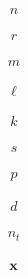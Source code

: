 \documentclass[12 pt]{article}
\begin{document}

\begin{align*}
    n
\end{align*}

\begin{align*}
    r
\end{align*}

\begin{align*}
    m
\end{align*}

\begin{align*}
    \ell
\end{align*}

\begin{align*}
    k
\end{align*}

\begin{align*}
    s
\end{align*}

\begin{align*}
    p
\end{align*}

\begin{align*}
    d
\end{align*}

\begin{align*}
    n_t
\end{align*}


\begin{align*}
    \mathbf{x}
\end{align*}
\end{document}
